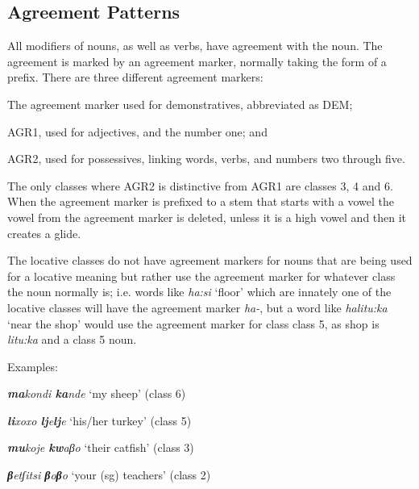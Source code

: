 
\subsection{Agreement Patterns} \label{sec:agreement}
All modifiers of nouns, as well as verbs, have agreement with the noun.  The agreement is marked by an agreement marker, normally taking the form of a prefix.  There are three different agreement markers:
\begin{inparaenum}
\item \label{agrdem} The agreement marker used for demonstratives, abbreviated as DEM;
\item \label{agr1} AGR1, used for adjectives, and the number one; and
\item \label{agr2} AGR2, used for possessives, linking words, verbs, and numbers two through five.
\end{inparaenum}  The only classes where AGR2 is distinctive from AGR1 are classes 3, 4 and 6.  When the agreement marker is prefixed to a stem that starts with a vowel the vowel from the agreement marker is deleted, unless it is a high vowel and then it creates a glide.

The locative classes do not have agreement markers for nouns that are being used for a locative meaning but rather use the agreement marker for whatever class the noun normally is; i.e. words like \emph{ha:si} `floor' which are innately one of the locative classes will have the agreement marker \emph{ha-}, but a word like \emph{halitu:ka} `near the shop' would use the agreement marker for class class 5, as shop is \emph{litu:ka} and a class 5 noun.

Examples:\begin{wrdex}
\item \emph{\textbf{ma}kondi \textbf{ka}nd\ezh{}e} `my sheep' (class 6) 
\item \emph{\textbf{li}xoxo \textbf{lj}e\textbf{lj}e} `his/her turkey' (class 5)
\item \emph{\textbf{mu}koje \textbf{kw}aβo} `their catfish' (class 3)
\item \emph{\textbf{β}etʃitsi \textbf{β}o\textbf{β}o} `your (sg) teachers' (class 2)
\end{wrdex} 

